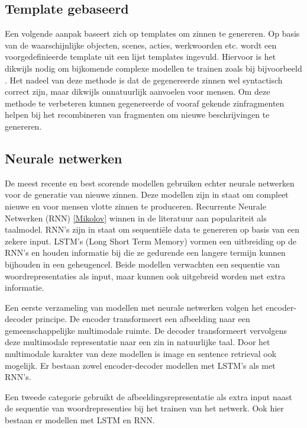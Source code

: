 \subsection{Template gebaseerd}
Een volgende aanpak baseert zich op templates om zinnen te genereren. Op basis van de waarschijnlijke objecten, scenes, acties, werkwoorden etc. wordt een voorgedefinieerde template uit een lijst templates ingevuld.\cite{Yang} Hiervoor is het dikwijls nodig om bijkomende complexe modellen te trainen zoals bij bijvoorbeeld \cite{Elliott}. Het nadeel van deze methode is dat de gegenereerde zinnen wel syntactisch correct zijn, maar dikwijls onnatuurlijk aanvoelen voor mensen. Om deze methode te verbeteren kunnen gegenereerde of vooraf gekende zinfragmenten helpen bij het recombineren van fragmenten om nieuwe beschrijvingen te genereren. \cite{Mitchell}\cite{Kuznetsova}

\subsection{Neurale netwerken}
De meest recente en best scorende modellen gebruiken echter neurale netwerken voor de generatie van nieuwe zinnen. Deze modellen zijn in staat om compleet nieuwe en voor mensen vlotte zinnen te produceren. Recurrente Neurale Netwerken (RNN) \ref{Mikolov} winnen in de literatuur aan populariteit als taalmodel. RNN's zijn in staat om sequenti\"ele data te genereren op basis van een zekere input. LSTM's (Long Short Term Memory) vormen een uitbreiding op de RNN's en houden informatie bij die ze gedurende een langere termijn kunnen bijhouden in een geheugencel. Beide modellen verwachten een sequentie van woordrepresentaties als input, maar kunnen ook uitgebreid worden met extra informatie. \cite{Kiros}\cite{Xu Kul}\cite{Socher} 

Een eerste verzameling van modellen met neurale netwerken volgen het encoder-decoder principe.\cite{Kiros} De encoder transformeert een afbeelding naar een gemeenschappelijke multimodale ruimte. De decoder transformeert vervolgens deze multimodale representatie naar een zin in natuurlijke taal. Door het multimodale karakter van deze modellen is image en sentence retrieval ook mogelijk. Er bestaan zowel encoder-decoder modellen met LSTM's\cite{Kiros} als met RNN's\cite{Karpathy1}\cite{Mao}.

Een tweede categorie gebruikt de afbeeldingsrepresentatie als extra input naast de sequentie van 
woordrepresenties bij het trainen van het netwerk. Ook hier bestaan er modellen met LSTM \cite{Donahue} en RNN\cite{Karpathy}.

